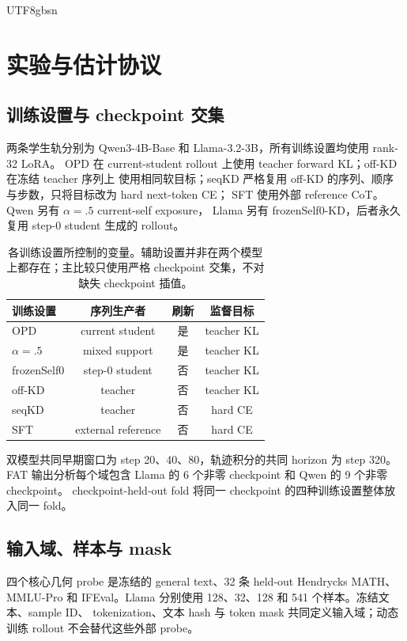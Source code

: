 \documentclass[letterpaper]{article} %
\begin{document}
\begin{CJK*}{UTF8}{gbsn}
\section{实验与估计协议}

\subsection{训练设置与 checkpoint 交集}

两条学生轨分别为 Qwen3-4B-Base 和 Llama-3.2-3B，所有训练设置均使用 rank-32 LoRA。
OPD 在 current-student rollout 上使用 teacher forward KL；off-KD 在冻结 teacher 序列上
使用相同软目标；seqKD 严格复用 off-KD 的序列、顺序与步数，只将目标改为 hard next-token CE；
SFT 使用外部 reference CoT。Qwen 另有 $\alpha=.5$ current-self exposure，
Llama 另有 frozenSelf0-KD，后者永久复用 step-0 student 生成的 rollout。

\begin{table}[t]
\centering
\small
\setlength{\tabcolsep}{3.5pt}
\begin{tabular}{lccc}
\toprule
训练设置 & 序列生产者 & 刷新 & 监督目标 \\
\midrule
OPD & current student & 是 & teacher KL \\
$\alpha=.5$ & mixed support & 是 & teacher KL \\
frozenSelf0 & step-0 student & 否 & teacher KL \\
off-KD & teacher & 否 & teacher KL \\
seqKD & teacher & 否 & hard CE \\
SFT & external reference & 否 & hard CE \\
\bottomrule
\end{tabular}
\caption{各训练设置所控制的变量。辅助设置并非在两个模型上都存在；主比较只使用严格
checkpoint 交集，不对缺失 checkpoint 插值。}
\label{tab:supp-arms}
\end{table}

双模型共同早期窗口为 step 20、40、80，轨迹积分的共同 horizon 为 step 320。
FAT 输出分析每个域包含 Llama 的 6 个非零 checkpoint 和 Qwen 的 9 个非零 checkpoint。
checkpoint-held-out fold 将同一 checkpoint 的四种训练设置整体放入同一 fold。

\subsection{输入域、样本与 mask}

四个核心几何 probe 是冻结的 general text、32 条 held-out Hendrycks MATH、
MMLU-Pro 和 IFEval。Llama 分别使用 128、32、128 和 541 个样本。冻结文本、sample ID、
tokenization、文本 hash 与 token mask 共同定义输入域；动态训练 rollout 不会替代这些外部 probe。


\end{CJK*}
\end{document}
